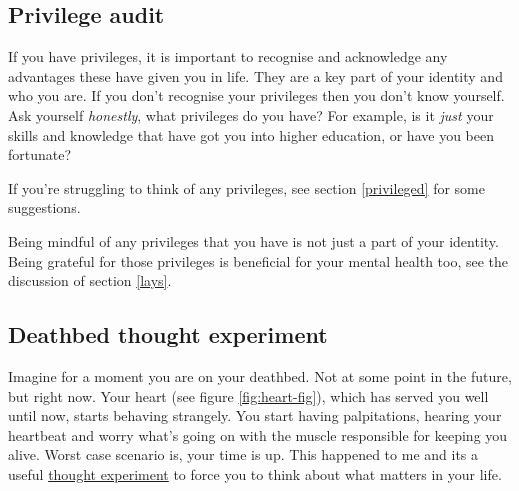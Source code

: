 \documentclass[
]{book}
\begin{document}
\hypertarget{apriv}{%
\subsection{Privilege audit}\label{apriv}}

If you have privileges, it is important to recognise and acknowledge any advantages these have given you in life. They are a key part of your identity and who you are. If you don't recognise your privileges then you don't know yourself. Ask yourself \emph{honestly}, what privileges do you have? For example, is it \emph{just} your skills and knowledge that have got you into higher education, or have you been fortunate?

If you're struggling to think of any privileges, see section \ref{privileged} for some suggestions.

Being mindful of any privileges that you have is not just a part of your identity. Being grateful for those privileges is beneficial for your mental health too, see the discussion of section \ref{lays}.

\hypertarget{regrets}{%
\subsection{Deathbed thought experiment}\label{regrets}}

Imagine for a moment you are on your deathbed. Not at some point in the future, but right now. Your heart (see figure \ref{fig:heart-fig}), which has served you well until now, starts behaving strangely. You start having palpitations, hearing your heartbeat \citep{elektrokardiogramm} and worry what's going on with the muscle responsible for keeping you alive. Worst case scenario is, your time is up. This happened to me and its a useful \href{https://en.wikipedia.org/wiki/Thought_experiment}{thought experiment} to force you to think about what matters in your life. \citep{deathbed}
\end{document}

